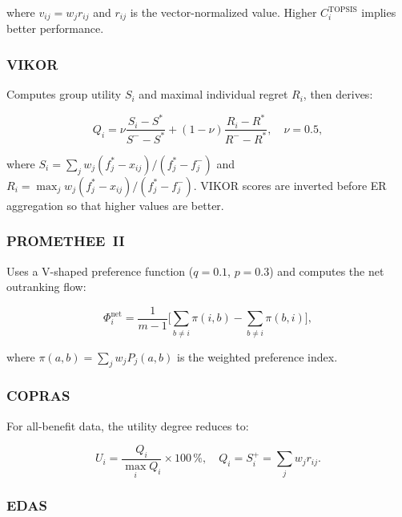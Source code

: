 \documentclass[12pt, a4paper]{article}
\begin{document}
where $v_{ij} = w_j r_{ij}$ and $r_{ij}$ is the vector-normalized value. Higher
$C_i^{\text{TOPSIS}}$ implies better performance.

\subsubsection{VIKOR \citep{OpricovicTzeng2004}}

Computes group utility $S_i$ and maximal individual regret $R_i$, then derives:

\begin{equation}
  Q_i = \nu \frac{S_i - S^*}{S^- - S^*} + (1-\nu)\frac{R_i - R^*}{R^- - R^*},
  \quad \nu = 0.5,
  \label{eq:vikor}
\end{equation}

where $S_i = \sum_j w_j(f_j^* - x_{ij})/(f_j^* - f_j^-)$ and
$R_i = \max_j w_j(f_j^* - x_{ij})/(f_j^* - f_j^-)$.
VIKOR scores are inverted before ER aggregation so that higher values are better.

\subsubsection{PROMETHEE~II \citep{BransVincke1985}}

Uses a V-shaped preference function ($q=0.1$, $p=0.3$) and computes the net
outranking flow:

\begin{equation}
  \Phi_i^{\text{net}} = \frac{1}{m-1}\biggl[\sum_{b \neq i}\pi(i,b) -
  \sum_{b \neq i}\pi(b,i)\biggr],
  \label{eq:promethee}
\end{equation}

where $\pi(a,b) = \sum_j w_j P_j(a,b)$ is the weighted preference index.

\subsubsection{COPRAS \citep{Zavadskas1994}}

For all-benefit data, the utility degree reduces to:

\begin{equation}
  U_i = \frac{Q_i}{\max_i Q_i} \times 100\,\%, \quad
  Q_i = S_i^+ = \sum_j w_j r_{ij}.
  \label{eq:copras}
\end{equation}

\subsubsection{EDAS \citep{Ghorabaee2015}}
\end{document}
